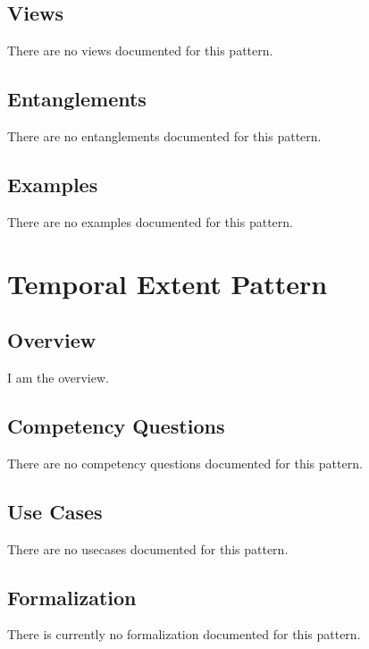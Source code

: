 \subsection{Views}
\label{ssec:views}
There are no views documented for this pattern.


\subsection{Entanglements}
\label{ssec:entanglements}
There are no entanglements documented for this pattern.

\subsection{Examples}
\label{ssec:examples}
There are no examples documented for this pattern.


\section{Temporal Extent Pattern}
\label{sec:temporal-extent-pattern}
\subsection{Overview}
\label{ssec:overview}
I am the overview.

\subsection{Competency Questions}
\label{ssec:cqs}
There are no competency questions documented for this pattern.

\subsection{Use Cases}
\label{ssec:use-cases}
There are no usecases documented for this pattern.
\subsection{Formalization}
\label{ssec:formalization}
There is currently no formalization documented for this pattern.

